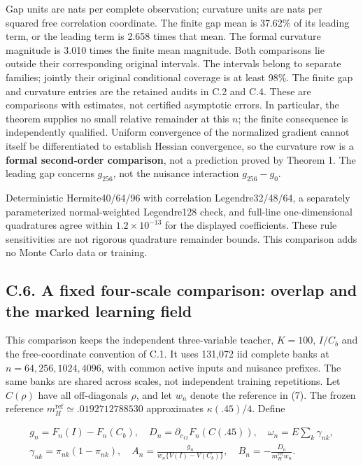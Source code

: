 \documentclass{article}
\begin{document}
Gap units are nats per complete observation; curvature units are nats
per squared free correlation coordinate. The finite gap mean is 37.62\%
of its leading term, or the leading term is 2.658 times that mean. The
formal curvature magnitude is 3.010 times the finite mean magnitude.
Both comparisons lie outside their corresponding original intervals. The
intervals belong to separate families; jointly their original
conditional coverage is at least 98\%. The finite gap and curvature
entries are the retained audits in C.2 and C.4. These are comparisons
with estimates, not certified asymptotic errors. In particular, the
theorem supplies no small relative remainder at this \(n\); the finite
consequence is independently qualified. Uniform convergence of the
normalized gradient cannot itself be differentiated to establish Hessian
convergence, so the curvature row is a \textbf{formal second-order
comparison}, not a prediction proved by Theorem 1. The leading gap
concerns \(g_{256}\), not the nuisance interaction \(g_{256}-g_0\).

Deterministic Hermite40/64/96 with correlation Legendre32/48/64, a
separately parameterized normal-weighted Legendre128 check, and
full-line one-dimensional quadratures agree within \(1.2\times10^{-13}\)
for the displayed coefficients. These rule sensitivities are not
rigorous quadrature remainder bounds. This comparison adds no Monte
Carlo data or training.

\subsection*{C.6. A fixed four-scale comparison: overlap and the marked
learning
field}\label{c.6.-a-fixed-four-scale-comparison-overlap-and-the-marked-learning-field}

This comparison keeps the independent three-variable teacher, \(K=100\),
\(I/C_b\) and the free-coordinate convention of C.1. It uses 131,072 iid
complete banks at \(n=64,256,1024,4096\), with common active inputs and
nuisance prefixes. The same banks are shared across scales, not
independent training repetitions. Let \(C(\rho)\) have all off-diagonals
\(\rho\), and let \(w_n\) denote the reference in (7). The frozen
reference \(m_H^{\mathrm{ref}}\simeq.0192712788530\) approximates
\(\kappa(.45)/4\). Define

\[
\begin{gathered}
g_n=F_n(I)-F_n(C_b),\quad D_n=\partial_{c_{12}}F_n(C(.45)),\quad
\omega_n=E\sum_k\gamma_{nk},\\
\gamma_{nk}=\pi_{nk}(1-\pi_{nk}),\quad
A_n=\frac{g_n}{w_n\{V(I)-V(C_b)\}},\quad B_n=-\frac{D_n}{m_H^{\mathrm{ref}}w_n}.
\end{gathered}
\tag{C.15}
\]
\end{document}
